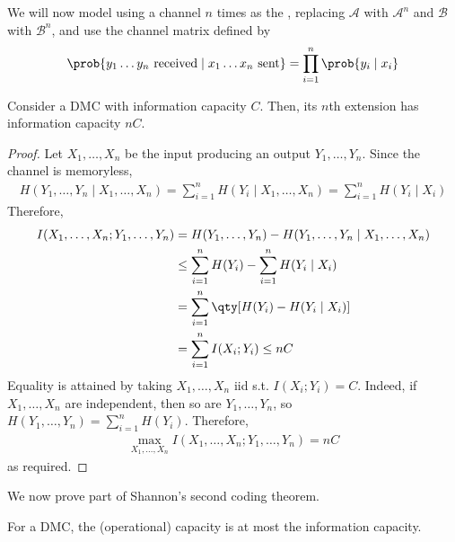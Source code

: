 We will now model using a channel $n$ times as the , replacing $\mathcal A$ with $\mathcal A^n$ and $\mathcal B$ with $\mathcal B^n$, and use the channel matrix defined by
\begin{align*}
    \prob{y_1 \dots y_n \text{ received} \mid x_1 \dots x_n \text{ sent}} = \prod_{i=1}^n \prob{y_i \mid x_i}
\end{align*}

\begin{lemma}
    Consider a DMC with information capacity $C$.
    Then, its $n$th extension has information capacity $nC$.
\end{lemma}

\begin{proof}
    Let $X_1, \dots, X_n$ be the input producing an output $Y_1, \dots, Y_n$.
    Since the channel is memoryless,
    \begin{align*}
        H(Y_1, \dots, Y_n \mid X_1, \dots, X_n) = \sum_{i=1}^n H(Y_i \mid X_1, \dots, X_n) = \sum_{i=1}^n H(Y_i \mid X_i)
    \end{align*}
    Therefore,
    \begin{align*}
        I(X_1, \dots, X_n; Y_1, \dots, Y_n) &= H(Y_1, \dots, Y_n) - H(Y_1, \dots, Y_n \mid X_1, \dots, X_n) \\
        &\leq \sum_{i=1}^n H(Y_i) - \sum_{i=1}^n H(Y_i \mid X_i) \\
        &= \sum_{i=1}^n \qty[H(Y_i) - H(Y_i \mid X_i)] \\
        &= \sum_{i=1}^n I(X_i;Y_i) \leq nC
    \end{align*}
    Equality is attained by taking $X_1, \dots, X_n$ iid s.t. $I(X_i;Y_i) = C$.
    Indeed, if $X_1, \dots, X_n$ are independent, then so are $Y_1, \dots, Y_n$, so $H(Y_1, \dots, Y_n) = \sum_{i=1}^n H(Y_i)$.
    Therefore,
    \begin{align*}
        \max_{X_1, \dots, X_n} I(X_1, \dots, X_n; Y_1, \dots, Y_n) = nC
    \end{align*}
    as required.
\end{proof}

We now prove part of Shannon's second coding theorem.

\begin{proposition}
    For a DMC, the (operational) capacity is at most the information capacity.
\end{proposition}


